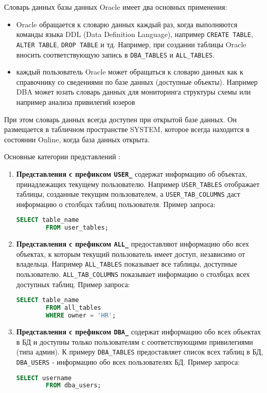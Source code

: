 \begin{enumerate}
    Словарь данных базы данных Oracle имеет два основных применения:
    \begin{itemize}
        \item Oracle обращается к словарю данных каждый раз, когда выполняются команды языка DDL (Data Definition Language), например \texttt{CREATE TABLE}, \texttt{ALTER TABLE}, \texttt{DROP TABLE} и тд. Например, при создании таблицы Oracle вносить соответствующую запись в \texttt{DBA\_TABLES} и \texttt{ALL\_TABLES}.
        \item каждый пользователь Oracle может обращаться к словарю данных как к справочнику со сведениями по базе данных (доступные объекты). Например DBA может юзать словарь данных для мониторинга структуры схемы или например анализа привилегий юзеров
    \end{itemize}

    При этом словарь данных всегда доступен при открытой базе данных. Он размещается в табличном пространстве SYSTEM, которое всегда находится в состоянии Online, когда база данных открыта.

    Основные категории представлений \autocite{oracledbdoc1}:
    \begin{enumerate}

        \item \textbf{Представления с префиксом \texttt{USER\_}} содержат информацию об объектах, принадлежащих текущему пользователю. Например \texttt{USER\_TABLES} отображает таблицы, созданные текущим пользователем, а \texttt{USER\_TAB\_COLUMNS} даст информацию о столбцах таблиц пользователя.
        Пример запроса:
        \begin{lstlisting}[language=SQL]
        SELECT table_name 
        FROM user_tables;
        \end{lstlisting}

        \item \textbf{Представления с префиксом \texttt{ALL\_}} предоставляют информацию обо всех объектах, к которым текущий пользователь имеет доступ, независимо от владельца. Например \texttt{ALL\_TABLES} показывает все таблицы, доступные пользователю. \texttt{ALL\_TAB\_COLUMNS} показывает информацию о столбцах всех доступных таблиц.
        Пример запроса:
        \begin{lstlisting}[language=SQL]
        SELECT table_name 
        FROM all_tables 
        WHERE owner = 'HR';
        \end{lstlisting}

        \item \textbf{Представления с префиксом \texttt{DBA\_}} содержат информацию обо всех объектах в БД и доступны только пользователям с соответствующими привилегиями (типа админ). К примеру \texttt{DBA\_TABLES} предоставляет список всех таблиц в БД, \texttt{DBA\_USERS} - информацию обо всех пользователях БД.
        Пример запроса:
        \begin{lstlisting}[language=SQL]
        SELECT username 
        FROM dba_users;
        \end{lstlisting}


\end{enumerate}
\end{enumerate}
